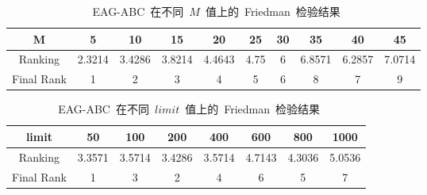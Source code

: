 \begin{table*}[!ht]
  \centering
  \caption{~EAG-ABC~在不同~$M$~值上的~Friedman~检验结果}
  \scriptsize
    \begin{tabular}{|c|c|c|c|c|c|c|c|c|c|}
    \hline
    M     & 5     & 10    & 15    & 20    & 25    & 30    & 35    & 40    & 45 \\	\hline
    Ranking & 2.3214 & 3.4286 & 3.8214 & 4.4643 & 4.75  & 6     & 6.8571 & 6.2857 & 7.0714 \\	\hline
    Final Rank & 1     & 2     & 3     & 4     & 5     & 6     & 8     & 7     & 9 \\	
    \hline
    \end{tabular}%
  \label{tab:AG_parameter_M}%
\end{table*}%

\begin{table*}[!ht]
  \centering
  \caption{~EAG-ABC~在不同~$limit$~值上的~Friedman~检验结果}
  \scriptsize
    \begin{tabular}{|c|c|c|c|c|c|c|c|}
    \hline
    limit & 50    & 100   & 200   & 400   & 600   & 800   & 1000 \\	\hline
    Ranking & 3.3571 & 3.5714 & 3.4286 & 3.5714 & 4.7143 & 4.3036 & 5.0536 \\	\hline
    Final Rank & 1     & 3     & 2     & 4     & 6     & 5     &7 \\
    \hline
    \end{tabular}%
  \label{tab:AG_parameter_limit}%
\end{table*}%

